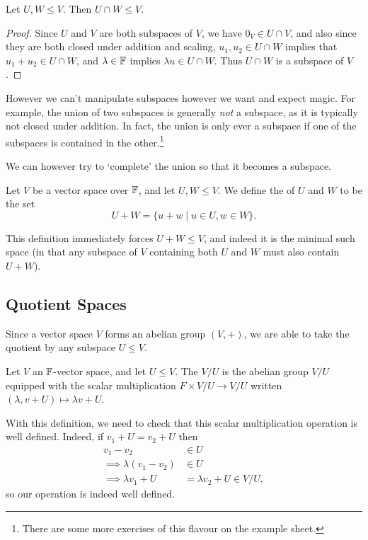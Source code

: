 \documentclass[a4paper]{scrartcl}
\begin{document}
\begin{proposition}
    Let $U, W \leq V$. Then $U \cap W \leq V$.
\end{proposition}
\begin{proof}
    Since $U$ and $V$ are both subspaces of $V$, we have $0_V \in U \cap V$, and also since they are both closed under addition and scaling, $u_1, u_2 \in U \cap W$ implies that $u_1 + u_2 \in U \cap W$, and $\lambda \in \mathbb{F}$ implies $\lambda u \in U\cap W$. Thus $U \cap W$ is a subspace of $V$. 
\end{proof}

However we can't manipulate subspaces however we want and expect magic. For example, the union of two subspaces is generally \emph{not} a subspace, as it is typically not closed under addition. In fact, the union is only ever a subspace if one of the subspaces is contained in the other.\footnote{There are some more exercises of this flavour on the example sheet.}

We can however try to `complete' the union so that it becomes a subspace.

\begin{definition}
    Let $V$ be a vector space over $\mathbb{F}$, and let $U, W \leq V$. We define the  of $U$ and $W$ to be the set
    $$
    U + W = \{u + w \mid u \in U, w \in W \}.
    $$
\end{definition}

This definition immediately forces $U + W \leq V$, and indeed it is the minimal such space (in that any subspace of $V$ containing both $U$ and $W$ must also contain $U + W$).

\subsection{Quotient Spaces}

Since a vector space $V$ forms an abelian group $(V, +)$, we are able to take the quotient by any subspace $U \leq V$. 

\begin{definition}
    Let $V$ an $\mathbb{F}$-vector space, and let $U \leq V$. The  $V/U$ is the abelian group $V/U$ equipped with the scalar multiplication $F \times V/U \rightarrow V/U$ written $(\lambda, v + U) \mapsto \lambda v + U$.
\end{definition}

With this definition, we need to check that this scalar multiplication operation 
is well defined. Indeed, if $v_1 + U = v_2 + U$ then
\begin{align*}
    v_1 - v_2 &\in U \\
\implies \lambda(v_1 - v_2) &\in U \\
\implies \lambda v_1 + U &= \lambda v_2 + U \in V/U,
\end{align*}
so our operation is indeed well defined.
\end{document}
